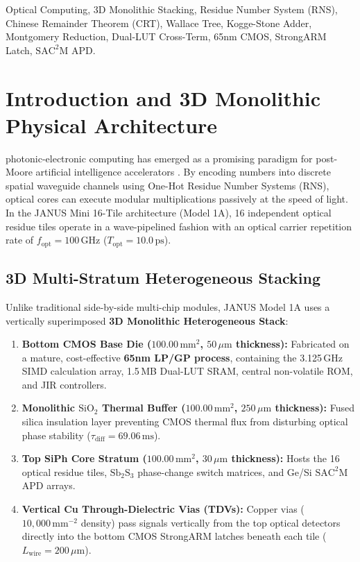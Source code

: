 \documentclass[10pt,journal,compsoc]{IEEEtran}
\begin{document}
{\begin{IEEEkeywords}
Optical Computing, 3D Monolithic Stacking, Residue Number System (RNS), Chinese Remainder Theorem (CRT), Wallace Tree, Kogge-Stone Adder, Montgomery Reduction, Dual-LUT Cross-Term, 65nm CMOS, StrongARM Latch, $\mathrm{SAC^2M}$ APD.
\end{IEEEkeywords}}

\maketitle

\section{Introduction and 3D Monolithic Physical Architecture}\label{sec:introduction}

 photonic-electronic computing has emerged as a promising paradigm for post-Moore artificial intelligence accelerators \cite{dong2022sb2s3}. By encoding numbers into discrete spatial waveguide channels using One-Hot Residue Number Systems (RNS), optical cores can execute modular multiplications passively at the speed of light. In the JANUS Mini 16-Tile architecture (Model 1A), 16 independent optical residue tiles operate in a wave-pipelined fashion with an optical carrier repetition rate of $f_{\text{opt}} = 100\,\text{GHz}$ ($T_{\text{opt}} = 10.0\,\text{ps}$).

\subsection{3D Multi-Stratum Heterogeneous Stacking}
Unlike traditional side-by-side multi-chip modules, JANUS Model 1A uses a vertically superimposed \textbf{3D Monolithic Heterogeneous Stack}:
\begin{enumerate}
    \item \textbf{Bottom CMOS Base Die ($100.00\,\text{mm}^2$, $50\,\mu\text{m}$ thickness):} Fabricated on a mature, cost-effective \textbf{65nm LP/GP process}, containing the 3.125\,GHz SIMD calculation array, 1.5\,MB Dual-LUT SRAM, central non-volatile ROM, and JIR controllers.
    \item \textbf{Monolithic $\text{SiO}_2$ Thermal Buffer ($100.00\,\text{mm}^2$, $250\,\mu\text{m}$ thickness):} Fused silica insulation layer preventing CMOS thermal flux from disturbing optical phase stability ($\tau_{\text{diff}} = 69.06\,\text{ms}$).
    \item \textbf{Top SiPh Core Stratum ($100.00\,\text{mm}^2$, $30\,\mu\text{m}$ thickness):} Hosts the 16 optical residue tiles, $\text{Sb}_2\text{S}_3$ phase-change switch matrices, and Ge/Si $\mathrm{SAC^2M}$ APD arrays.
    \item \textbf{Vertical Cu Through-Dielectric Vias (TDVs):} Copper vias ($10,000\,\text{mm}^{-2}$ density) pass signals vertically from the top optical detectors directly into the bottom CMOS StrongARM latches beneath each tile ($L_{\text{wire}} = 200\,\mu\text{m}$).
\end{enumerate}
\end{document}
